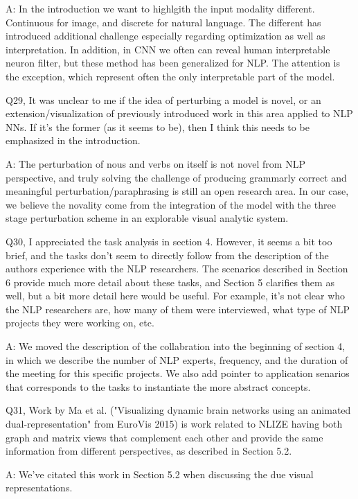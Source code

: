 A: In the introduction we want to highlgith the input modality different. Continuous for image, and discrete for natural language. The different has introduced additional challenge especially regarding optimization as well as interpretation. In addition, in CNN we often can reveal human interpretable neuron filter, but these method has been generalized for NLP. The attention is the exception, which represent often the only interpretable part of the model.

Q29, It was unclear to me if the idea of perturbing a model is novel, or an extension/visualization of previously introduced work in this area applied to NLP NNs. If it's the former (as it seems to be), then I think this needs to be emphasized in the introduction.

A: The perturbation of nous and verbs on itself is not novel from NLP perspective, and truly solving the challenge of producing grammarly correct and meaningful perturbation/paraphrasing is still an open research area. In our case, we believe the novality come from the integration of the model with the three stage perturbation scheme in an explorable visual analytic system.

Q30, I appreciated the task analysis in section 4. However, it seems a bit too brief, and the tasks don't seem to directly follow from the description of the authors experience with the NLP researchers. The scenarios described in Section 6 provide much more detail about these tasks, and Section 5 clarifies them as well, but a bit more detail here would be useful. For example, it's not clear who the NLP researchers are, how many of them were interviewed, what type of NLP projects they were working on, etc.

A: We moved the description of the collabration into the beginning of section 4, in which we describe the number of NLP experts, frequency, and the duration of the meeting for this specific projects. We also add pointer to application senarios that corresponds to the tasks to instantiate the more abstract concepts.

Q31, Work by Ma et al. ("Visualizing dynamic brain networks using an animated dual-representation" from EuroVis 2015) is work related to NLIZE having both graph and matrix views that complement each other and provide the same information from different perspectives, as described in Section 5.2.

A: We've citated this work in Section 5.2 when discussing the due visual representations.

